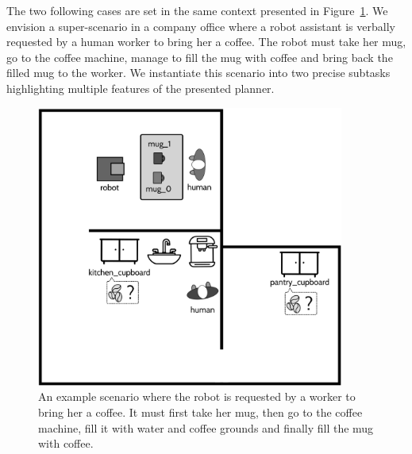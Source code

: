 \documentclass[a4paper,11pt,twoside]{StyleThese}
\begin{document}
The two following cases are set in the same context presented in Figure~\ref{fig:chap4coffeescene}. We envision a super-scenario in a company office where a robot assistant is verbally requested by a human worker to bring her a coffee. The robot must take her mug, go to the coffee machine, manage to fill the mug with coffee and bring back the filled mug to the worker.
We instantiate this scenario into two precise subtasks highlighting multiple features of the presented planner.

\begin{figure}[hbtp]
\centering
\includegraphics[width=0.9\textwidth]{figures/chapter4/Chap4CoffeeScene.png}
\caption{An example scenario where the robot is requested by a worker to bring her a coffee. It must first take her mug, then go to the coffee machine, fill it with water and coffee grounds and finally fill the mug with coffee.}
\label{fig:chap4coffeescene}
\end{figure}
\end{document}
